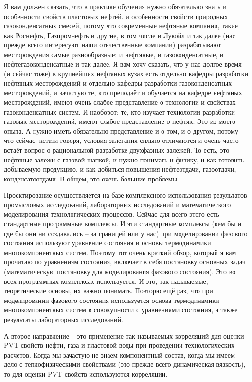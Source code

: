 \documentclass[main.tex]{subfiles}
\begin{document}
Я вам должен сказать, что в практике обучения нужно обязательно знать и особенности свойств пластовых нефтей, и особенности свойств природных газоконденсатных смесей, потому что современные нефтяные компании, такие как Роснефть, Газпромнефть и другие, в том числе и Лукойл и так далее (нас прежде всего интересуют наши отечественные компании) разрабатывают месторождения самые разнообразные: и нефтяные, и газоконденсатные, и нефтегазоконденсатные и так далее.
Я вам хочу сказать, что у нас долгое время (и сейчас тоже) в крупнейших нефтяных вузах есть отдельно кафедры разработки нефтяных месторождений и отдельно кафедры разработки газоконденсатных месторождений, и зачастую те, кто преподаёт и обучается на кафедре нефтяных месторождений, имеют очень слабое представление о технологии и свойствах газоконденсатных систем.
И наоборот: те, кто изучает технологии разработки газовых месторождений, имеют слабое представление о нефтях.
Это из моего опыта.
А нужно иметь обязательно представление и о том, и о другом, потому что сейчас, кстати говоря, условия залегания сильно отличаются и очень часто встаёт вопрос о рациональной разработке двухфазных залежей.
То есть, это нефтяные залежи с газовой шапкой, и нужно понимать и физику, и как готовить добываемую продукцию, и как добиться повышения нефтеотдачи, газоотдачи, конденсатоотдачи.
В общем, это очень большие проблемы.

Проектирование осуществляется на базе комплексного использования результатов промысловых исследований, лабораторных исследований и математического моделирования технологических процессов.
Сейчас для всего этого есть стандартные программные комплексы.
И эти стандартные комплексы (кем бы и где бы они ни создавались -- за границей или у нас) при моделировании фазового состояния используют уравнение состояния и основы термодинамики многокомпонентных систем.
Поэтому тот очень краткий обзор, который я вам прочитаю по уравнениям состояния, включает в себя постановку основных задач (математическую постановку для моделирования фазового состояния).
Это во всех программных комплексах используется.
И это, так называемые, теоретические основы, их важно понимать.
Повторю ещё раз, что при моделировании фазового состояния используется основа термодинамики многокомпонентных систем в совокупности с уравнениями состояния, а также результаты лабораторных исследований.

А второе направление -- это применение так называемых корреляций для оценки PVT-свойств нефти, газа и пластовой воды при проведении технологических расчетов.
Когда мы зачастую не знаем компонентный состав, когда мы имеем дело с теплофизическими свойствами (это прежде всего динамическая вязкость), то для оценки PVT-свойств используются корреляции.
\end{document}
